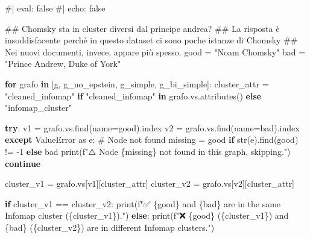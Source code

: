 \documentclass[
  italian,
  a4paper,
]{article}
\newenvironment{Shaded}{\begin{snugshade}}{\end{snugshade}}
\newcommand{\BuiltInTok}[1]{\textcolor[rgb]{0.00,0.23,0.31}{#1}}
\newcommand{\CommentTok}[1]{\textcolor[rgb]{0.37,0.37,0.37}{#1}}
\newcommand{\ControlFlowTok}[1]{\textcolor[rgb]{0.00,0.23,0.31}{\textbf{#1}}}
\newcommand{\DecValTok}[1]{\textcolor[rgb]{0.68,0.00,0.00}{#1}}
\newcommand{\ImportTok}[1]{\textcolor[rgb]{0.00,0.46,0.62}{#1}}
\newcommand{\KeywordTok}[1]{\textcolor[rgb]{0.00,0.23,0.31}{\textbf{#1}}}
\newcommand{\NormalTok}[1]{\textcolor[rgb]{0.00,0.23,0.31}{#1}}
\newcommand{\OperatorTok}[1]{\textcolor[rgb]{0.37,0.37,0.37}{#1}}
\newcommand{\PreprocessorTok}[1]{\textcolor[rgb]{0.68,0.00,0.00}{#1}}
\newcommand{\SpecialCharTok}[1]{\textcolor[rgb]{0.37,0.37,0.37}{#1}}
\newcommand{\SpecialStringTok}[1]{\textcolor[rgb]{0.13,0.47,0.30}{#1}}
\newcommand{\StringTok}[1]{\textcolor[rgb]{0.13,0.47,0.30}{#1}}
\begin{document}
\begin{Shaded}
\begin{Highlighting}[]

\CommentTok{\#| eval: false}
\CommentTok{\#| echo: false}

\CommentTok{\#\# Chomsky sta in cluster diversi dal principe andrea? }
\CommentTok{\#\# La risposta è insoddisfacente perché in questo dataset ci sono poche istanze di Chomsky}
\CommentTok{\#\# Nei nuovi documenti, invece, appare più spesso. }
\NormalTok{good }\OperatorTok{=} \StringTok{"Noam Chomsky"}
\NormalTok{bad }\OperatorTok{=} \StringTok{"Prince Andrew, Duke of York"}  

\ControlFlowTok{for}\NormalTok{ grafo }\KeywordTok{in}\NormalTok{ [g, g\_no\_epstein, g\_simple, g\_bi\_simple]:}
\NormalTok{    cluster\_attr }\OperatorTok{=} \StringTok{"cleaned\_infomap"} \ControlFlowTok{if} \StringTok{"cleaned\_infomap"} \KeywordTok{in}\NormalTok{ grafo.vs.attributes() }\ControlFlowTok{else} \StringTok{"infomap\_cluster"}
    
    \ControlFlowTok{try}\NormalTok{:}
\NormalTok{        v1 }\OperatorTok{=}\NormalTok{ grafo.vs.find(name}\OperatorTok{=}\NormalTok{good).index}
\NormalTok{        v2 }\OperatorTok{=}\NormalTok{ grafo.vs.find(name}\OperatorTok{=}\NormalTok{bad).index}
    \ControlFlowTok{except} \PreprocessorTok{ValueError} \ImportTok{as}\NormalTok{ e:}
        \CommentTok{\# Node not found}
\NormalTok{        missing }\OperatorTok{=}\NormalTok{ good }\ControlFlowTok{if} \BuiltInTok{str}\NormalTok{(e).find(good) }\OperatorTok{!=} \OperatorTok{{-}}\DecValTok{1} \ControlFlowTok{else}\NormalTok{ bad}
        \BuiltInTok{print}\NormalTok{(}\SpecialStringTok{f"⚠️ Node \textquotesingle{}}\SpecialCharTok{\{}\NormalTok{missing}\SpecialCharTok{\}}\SpecialStringTok{\textquotesingle{} not found in this graph, skipping."}\NormalTok{)}
        \ControlFlowTok{continue}
    
\NormalTok{    cluster\_v1 }\OperatorTok{=}\NormalTok{ grafo.vs[v1][cluster\_attr]}
\NormalTok{    cluster\_v2 }\OperatorTok{=}\NormalTok{ grafo.vs[v2][cluster\_attr]}

    \ControlFlowTok{if}\NormalTok{ cluster\_v1 }\OperatorTok{==}\NormalTok{ cluster\_v2:}
        \BuiltInTok{print}\NormalTok{(}\SpecialStringTok{f"✅ \textquotesingle{}}\SpecialCharTok{\{}\NormalTok{good}\SpecialCharTok{\}}\SpecialStringTok{\textquotesingle{} and \textquotesingle{}}\SpecialCharTok{\{}\NormalTok{bad}\SpecialCharTok{\}}\SpecialStringTok{\textquotesingle{} are in the same Infomap cluster (}\SpecialCharTok{\{}\NormalTok{cluster\_v1}\SpecialCharTok{\}}\SpecialStringTok{)."}\NormalTok{)}
    \ControlFlowTok{else}\NormalTok{:}
        \BuiltInTok{print}\NormalTok{(}\SpecialStringTok{f"❌ \textquotesingle{}}\SpecialCharTok{\{}\NormalTok{good}\SpecialCharTok{\}}\SpecialStringTok{\textquotesingle{} (}\SpecialCharTok{\{}\NormalTok{cluster\_v1}\SpecialCharTok{\}}\SpecialStringTok{) and \textquotesingle{}}\SpecialCharTok{\{}\NormalTok{bad}\SpecialCharTok{\}}\SpecialStringTok{\textquotesingle{} (}\SpecialCharTok{\{}\NormalTok{cluster\_v2}\SpecialCharTok{\}}\SpecialStringTok{) are in different Infomap clusters."}\NormalTok{)}
\end{Highlighting}
\end{Shaded}
\end{document}
